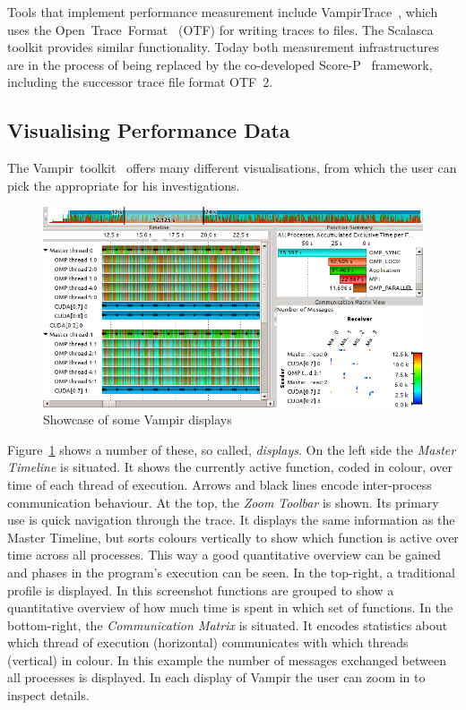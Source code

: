 \documentclass[b5paper, final, hauptseminar]{zih-template}
\begin{document}
Tools that implement performance measurement include VampirTrace~\cite{vampir08}, which uses the Open~Trace~Format~\cite{knuepfer06} (OTF) for writing traces to files.
The Scalasca~\cite{geimer10} toolkit provides similar functionality. Today both measurement infrastructures are in the process of being replaced by the co-developed Score-P~\cite{an_mey_ea10} framework, including the successor trace file format OTF~2.

\subsection{Visualising Performance Data}
The Vampir~toolkit~\cite{vampir08} offers many different visualisations, from which the user can pick the appropriate for his investigations. 
\begin{figure}[htbp]
	\centering
	\includegraphics[width=0.8\linewidth]{bg-vis-vampir}
	\caption{Showcase of some Vampir displays}
	\label{fig:bg-vis-vampir}
\end{figure}

Figure~\ref{fig:bg-vis-vampir} shows a number of these, so called, \emph{displays}.
On the left side the \emph{Master Timeline} is situated. It shows the currently active function, coded in colour, over time of each thread of execution. Arrows and black lines encode inter-process communication behaviour.
At the top, the \emph{Zoom Toolbar} is shown. Its primary use is quick navigation through the trace. It displays the same information as the Master Timeline, but sorts colours vertically to show which function is active over time across all processes. This way a good quantitative overview can be gained and phases in the program's execution can be seen.
In the top-right, a traditional profile is displayed. In this screenshot functions are grouped to show a quantitative overview of how much time is spent in which set of functions.
In the bottom-right, the \emph{Communication Matrix} is situated. It encodes statistics about which thread of execution (horizontal) communicates with which threads (vertical) in colour. In this example the number of messages exchanged between all processes is displayed.
In each display of Vampir the user can zoom in to inspect details.
\end{document}
